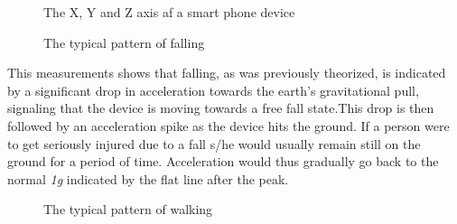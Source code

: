 \documentclass[12pt, a4paper, onecolumn]{article}
\begin{document}
	\begin{figure}[h]
		\centering
		\caption{The X, Y and Z axis af a smart phone device}%
		\label{fig:example}%
	\end{figure}
	
	\begin{figure}[h]
		\centering
		\caption{The typical pattern of falling}%
		\label{fig:example}%
	\end{figure}
	
	\noindent This measurements shows that falling, as was previously theorized, is indicated by a significant drop in acceleration towards the earth's gravitational pull, signaling that the device is moving towards a free fall state.This drop is then followed by an acceleration spike as the device hits the ground. If a person were to get seriously injured due to a fall s/he would usually remain still on the ground for a period of time. Acceleration would thus gradually go back to the normal \textit{1g} indicated by the flat line after the peak. 
	
	
	\begin{figure}[h]
		\centering
		\caption{The typical pattern of walking}%
		\label{fig:example}%
	\end{figure}
	
\end{document}
